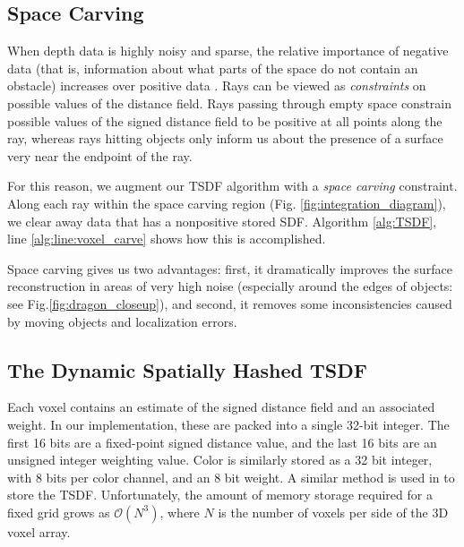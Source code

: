 \documentclass[10pt,twocolumn,letterpaper]{article}
\newcommand{\figref}[1]{Fig.\ref{#1}}
\begin{document}
\subsection{Space Carving}
\label{section:carving}
When depth data is highly noisy and sparse, the relative importance of negative
data (that is, information about what parts of the space do not contain an
obstacle) increases over positive data \cite{Klingensmith2014}. Rays can be
viewed as \textit{constraints} on possible values of the distance field. Rays
passing through empty space constrain possible values of the signed distance
field to be positive at all points along the ray, whereas rays hitting objects 
only inform us about the presence of a surface very near the endpoint of the ray.

For this reason, we augment our TSDF algorithm with a \textit{space carving}
constraint. Along each ray within the space carving region (Fig.
\ref{fig:integration_diagram}), we clear away data that has a nonpositive stored
SDF. Algorithm \ref{alg:TSDF}, line \ref{alg:line:voxel_carve} shows how this is
accomplished. 

Space carving gives us two advantages: first, it dramatically improves the
surface reconstruction in areas of very high noise (especially around the edges
of objects: see \figref{fig:dragon_closeup}), and second, it removes
some inconsistencies caused by moving objects and localization errors. 

\subsection{The Dynamic Spatially Hashed TSDF}
\label{section:spatialhash}
Each voxel contains an estimate of the signed distance field and an
associated weight. In our implementation, these are packed into a single 32-bit
integer. The first 16 bits are a fixed-point signed distance value, and the
last 16 bits  are an unsigned integer weighting value. Color is similarly
stored as a 32 bit integer, with 8 bits per color channel, and an 8 bit weight.
A similar method is used in \cite{Newcombe, Whelan2013, Bylow2013} to store the
TSDF. Unfortunately, the amount of memory storage required for a fixed grid
grows as $\mathcal{O}(N^3)$, where $N$ is the number of voxels per side of the 3D voxel
array. 

\end{document}
